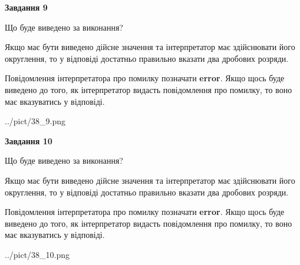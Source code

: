 \documentclass[12pt, ukrainian]{article}
\begin{document}
{\begin {Large}
{\begin {center}\textbf{Завдання 9}\end {center}}\par
Що буде виведено за виконання? \par

Якщо має бути виведено дійсне значення та інтерпретатор має здійснювати його округлення, 
то у відповіді достатньо правильно вказати два дробових розряди.

Повідомлення інтерпретатора про помилку позначати \textbf{error}.
Якщо щось буде виведено до того, як інтерпретатор видасть повідомлення про помилку, 
то воно має вказуватись у відповіді. \par

\begin{center}
	{../pict/38_9.png}
\end{center}
\newpage

{\begin {center}\textbf{Завдання 10}\end {center}}\par
Що буде виведено за виконання? \par

Якщо має бути виведено дійсне значення та інтерпретатор має здійснювати його округлення, 
то у відповіді достатньо правильно вказати два дробових розряди.

Повідомлення інтерпретатора про помилку позначати \textbf{error}.
Якщо щось буде виведено до того, як інтерпретатор видасть повідомлення про помилку, 
то воно має вказуватись у відповіді. \par

\begin{center}
	{../pict/38_10.png}
\end{center}
\newpage

\end {Large}}
\end{document}
